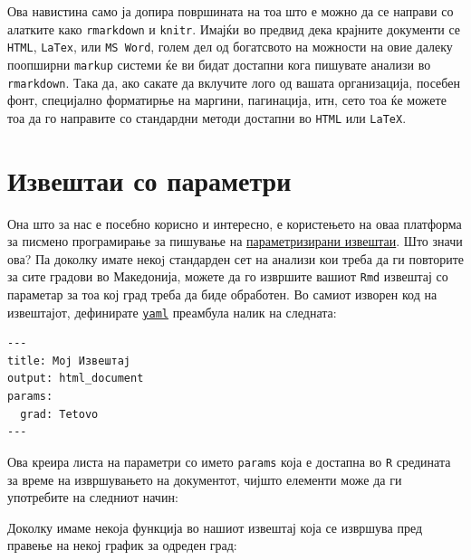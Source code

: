 \documentclass[
]{book}
\newenvironment{Shaded}{\begin{snugshade}}{\end{snugshade}}
\newcommand{\NormalTok}[1]{#1}
\newcommand{\SpecialCharTok}[1]{\textcolor[rgb]{0.00,0.00,0.00}{#1}}
\begin{document}
Ова навистина само ја допира површината на тоа што е можно да се направи со алатките како \texttt{rmarkdown} и \texttt{knitr}. Имајќи во предвид дека крајните документи се \texttt{HTML}, \texttt{LaTex}, или \texttt{MS\ Word}, голем дел од богатсвото на можности на овие далеку поопширни \texttt{markup} системи ќе ви бидат достапни кога пишувате анализи во \texttt{rmarkdown}. Така да, ако сакате да вклучите лого од вашата организација, посебен фонт, специјално форматирње на маргини, пагинација, итн, сето тоа ќе можете тоа да го направите со стандардни методи достапни во \texttt{HTML} или \texttt{LaTeX}.

\hypertarget{ux438ux437ux432ux435ux448ux442ux430ux438-ux441ux43e-ux43fux430ux440ux430ux43cux435ux442ux440ux438}{%
\section{Извештаи со параметри}\label{ux438ux437ux432ux435ux448ux442ux430ux438-ux441ux43e-ux43fux430ux440ux430ux43cux435ux442ux440ux438}}

Она што за нас е посебно корисно и интересно, е користењето на оваа платформа за писмено програмирање за пишување на \href{https://rmarkdown.rstudio.com/developer_parameterized_reports.html\%23parameter_types\%2F}{параметризирани извештаи}. Што значи ова? Па доколку имате некоj стандарден сет на анализи кои треба да ги повторите за сите градови во Македонија, можете да го извршите вашиот \texttt{Rmd} извештај со параметар за тоа кој град треба да биде обработен. Во самиот изворен код на извештајот, дефинирате \href{https://yaml.org/spec/1.2/spec.html}{\texttt{yaml}} преамбула налик на следната:

\begin{verbatim}
---
title: Мој Извештај
output: html_document
params:
  grad: Tetovo
---
\end{verbatim}

Ова креира листа на параметри со името \texttt{params} која е достапна во \texttt{R} средината за време на извршувањето на документот, чијшто елементи може да ги употребите на следниот начин:

\begin{Shaded}
\end{Shaded}

Доколку имаме некоја функција во нашиот извештај која се извршува пред правење на некој график за одреден град:
\end{document}
